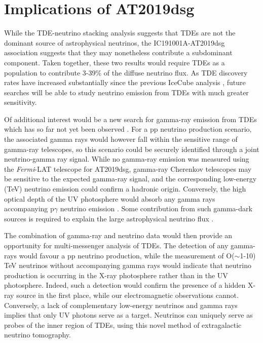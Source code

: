 \section{Implications of AT2019dsg}

While the TDE-neutrino stacking analysis suggests that TDEs are not the dominant source of astrophysical neutrinos, the IC191001A-AT2019dsg association suggests that they may nonetheless contribute a subdominant component. Taken together, these two results would require TDEs as a population to contribute 3-39\% of the diffuse neutrino flux. As TDE discovery rates have increased substantially since the previous IceCube analysis , future searches will be able to study neutrino emission from TDEs with much greater sensitivity.

Of additional interest would be a new search for gamma-ray emission from TDEs which has so far not yet been observed . For a pp neutrino production scenario, the associated gamma rays would however fall within the sensitive range of gamma-ray telescopes, so this scenario could be securely identified through a joint neutrino-gamma ray signal. While no gamma-ray emission was measured using the \textit{Fermi}-LAT telescope for AT2019dsg, gamma-ray Cherenkov telescopes may be sensitive to the expected gamma-ray signal, and the corresponding low-energy (TeV) neutrino emission could confirm a hadronic origin. Conversely, the high optical depth of the UV photosphere would absorb any gamma rays accompanying p$\gamma$ neutrino emission . Some contribution from such gamma-dark sources is required to explain the large astrophysical neutrino flux .

The combination of gamma-ray and neutrino data would then provide an opportunity for multi-messenger analysis of TDEs. The detection of any gamma-rays would favour a pp neutrino production, while the measurement of O($\sim$1-10) TeV neutrinos without accompanying gamma rays would indicate that neutrino production is occurring in the X-ray photosphere rather than in the UV photosphere. Indeed, such a detection would confirm the presence of a hidden X-ray source in the first place, while our electromagnetic observations cannot. Conversely, a lack of complementary low-energy neutrinos and gamma rays implies that only UV photons serve as a target. Neutrinos can uniquely serve as probes of the inner region of TDEs, using this novel method of extragalactic neutrino tomography. 